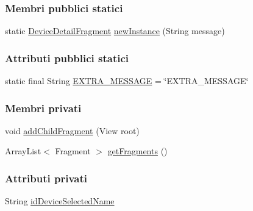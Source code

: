 \subsubsection*{Membri pubblici statici}
\begin{DoxyCompactItemize}
\item 
static \hyperlink{classit_1_1unibo_1_1torsello_1_1bluetoothpositioning_1_1fragment_1_1DeviceDetailFragment}{Device\+Detail\+Fragment} \hyperlink{classit_1_1unibo_1_1torsello_1_1bluetoothpositioning_1_1fragment_1_1DeviceDetailFragment_a626de18d36d44ae0b4ff21c2527bdf5a_a626de18d36d44ae0b4ff21c2527bdf5a}{new\+Instance} (String message)
\end{DoxyCompactItemize}
\subsubsection*{Attributi pubblici statici}
\begin{DoxyCompactItemize}
\item 
static final String \hyperlink{classit_1_1unibo_1_1torsello_1_1bluetoothpositioning_1_1fragment_1_1DeviceDetailFragment_a9f7fff4a2b22105976f2c7223d88f9ae_a9f7fff4a2b22105976f2c7223d88f9ae}{E\+X\+T\+R\+A\+\_\+\+M\+E\+S\+S\+A\+GE} = \char`\"{}E\+X\+T\+R\+A\+\_\+\+M\+E\+S\+S\+A\+GE\char`\"{}
\end{DoxyCompactItemize}
\subsubsection*{Membri privati}
\begin{DoxyCompactItemize}
\item 
void \hyperlink{classit_1_1unibo_1_1torsello_1_1bluetoothpositioning_1_1fragment_1_1DeviceDetailFragment_a62c541b8382a522f06a5d9c56cf50b26_a62c541b8382a522f06a5d9c56cf50b26}{add\+Child\+Fragment} (View root)
\item 
Array\+List$<$ Fragment $>$ \hyperlink{classit_1_1unibo_1_1torsello_1_1bluetoothpositioning_1_1fragment_1_1DeviceDetailFragment_a98e370cfcbfe5eaa4e1fe9242b00e639_a98e370cfcbfe5eaa4e1fe9242b00e639}{get\+Fragments} ()
\end{DoxyCompactItemize}
\subsubsection*{Attributi privati}
\begin{DoxyCompactItemize}
\item 
String \hyperlink{classit_1_1unibo_1_1torsello_1_1bluetoothpositioning_1_1fragment_1_1DeviceDetailFragment_a6d52d8371a07fb8da75879758d1d6942_a6d52d8371a07fb8da75879758d1d6942}{id\+Device\+Selected\+Name}
\end{DoxyCompactItemize}


